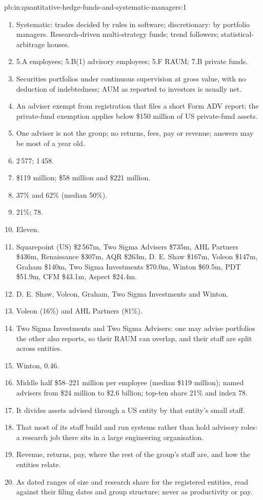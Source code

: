\begin{solution}{pb:in:quantitative-hedge-funds-and-systematic-managers:1}
\begin{enumerate}
\item Systematic: trades decided by rules in software; discretionary: by portfolio managers. Research-driven
multi-strategy funds; trend followers; statistical-arbitrage houses.
\item 5.A employees; 5.B(1) advisory employees; 5.F RAUM; 7.B private funds.
\item Securities portfolios under continuous supervision at gross value, with no deduction of indebtedness; AUM as
reported to investors is usually net.
\item An adviser exempt from registration that files a short Form ADV report; the private-fund exemption applies below
\$150 million of US private-fund assets.
\item One adviser is not the group; no returns, fees, pay or revenue; answers may be most of a year old.
\item 2\,577; 1\,458.
\item \$119 million; \$58 million and \$221 million.
\item 37\% and 62\% (median 50\%).
\item 21\%; 78.
\item Eleven.
\item Squarepoint (US) \$2\,567m, Two Sigma Advisers \$735m, AHL Partners \$436m, Renaissance \$307m, AQR \$263m, D. E.
Shaw \$167m, Voleon \$147m, Graham \$140m, Two Sigma Investments \$70.0m, Winton \$69.5m, PDT \$51.9m, CFM \$43.1m,
Aspect \$24.4m.
\item D. E. Shaw, Voleon, Graham, Two Sigma Investments and Winton.
\item Voleon (16\%) and AHL Partners (81\%).
\item Two Sigma Investments and Two Sigma Advisers: one may advise portfolios the other also reports, so their RAUM can
overlap, and their staff are split across entities.
\item Winton, 0.46.
\item Middle half \$58--221 million per employee (median \$119 million); named advisers from \$24 million to \$2.6
billion; top-ten share 21\% and index 78.
\item It divides assets advised through a US entity by that entity's small staff.
\item That most of its staff build and run systems rather than hold advisory roles: a research job there sits in a large
engineering organisation.
\item Revenue, returns, pay, where the rest of the group's staff are, and how the entities relate.
\item As dated ranges of size and research share for the registered entities, read against their filing dates and group
structure; never as productivity or pay.
\end{enumerate}
\end{solution}

